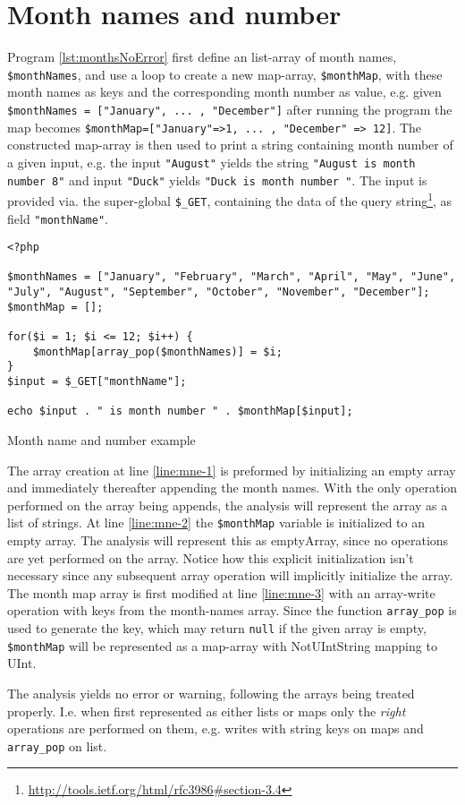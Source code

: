 \section{Month names and number}


Program \ref{lst:monthsNoError} first define an list-array of month names, \texttt{\$monthNames}, and use a loop to create a new map-array, \texttt{\$monthMap}, with these month names as keys and the corresponding month number as value, e.g. given \texttt{\$monthNames = ["January", ... , "December"]} after running the program the map becomes \texttt{\$monthMap=["January"=>1, ... , "December" => 12]}. The constructed map-array is then used to print a string containing month number of a given input, e.g. the input \texttt{"August"} yields the string \texttt{"August is month number 8"} and input \texttt{"Duck"} yields \texttt{"Duck is month number "}. The input is provided via. the super-global \texttt{\$\_GET}, containing the data of the query string\footnote{\url{http://tools.ietf.org/html/rfc3986\#section-3.4}}, as field \texttt{"monthName"}. 


\begin{program}
\begin{lstlisting}
<?php

$monthNames = ["January", "February", "March", "April", "May", "June", "July", "August", "September", "October", "November", "December"];
$monthMap = [];

for($i = 1; $i <= 12; $i++) {
	$monthMap[array_pop($monthNames)] = $i;
}
$input = $_GET["monthName"];

echo $input . " is month number " . $monthMap[$input];
\end{lstlisting}
\caption{Month name and number example}
\label{lst:monthsNoError}
\end{program}

The array creation at line \ref{line:mne-1} is preformed by initializing an empty array and immediately thereafter appending the month names. With the only operation performed on the array being appends, the analysis will represent the array as a list of strings. At line \ref{line:mne-2} the \texttt{\$monthMap} variable is initialized to an empty array. The analysis will represent this as emptyArray, since no operations are yet performed on the array. Notice how this explicit initialization isn't necessary since any subsequent array operation will implicitly initialize the array. The month map array is first modified at line \ref{line:mne-3} with an array-write operation with keys from the month-names array. Since the function \texttt{array\_pop} is used to generate the key, which may return \texttt{null} if the given array is empty, \texttt{\$monthMap} will be represented as a map-array with NotUIntString mapping to UInt. 

The analysis yields no error or warning, following the arrays being treated properly. I.e. when first represented as either lists or maps only the \emph{right} operations are performed on them, e.g. writes with string keys on maps and \texttt{array\_pop} on list.  
